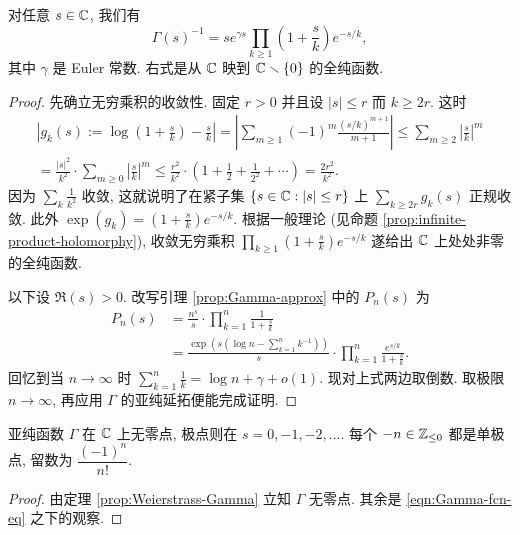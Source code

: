 \begin{theorem}[K.\ Weierstrass]\label{prop:Weierstrass-Gamma}
	对任意 $s \in \mathbb{C}$, 我们有
	\[ \Gamma(s)^{-1} = s e^{\gamma s} \prod_{k \geq 1} \left( 1 + \frac{s}{k} \right) e^{-s/k}, \]
	其中 $\gamma$ 是 Euler 常数.	右式是从 $\mathbb{C}$ 映到 $\mathbb{C} \smallsetminus \{0\}$ 的全纯函数.
\end{theorem}
\begin{proof}
	先确立无穷乘积的收敛性. 固定 $r > 0$ 并且设 $|s| \leq r$ 而 $k \geq 2r$. 这时
	\begin{multline*}
		\left| g_k(s) := \log\left( 1 + \frac{s}{k} \right) - \frac{s}{k} \right| = \left| \sum_{m \geq 1} (-1)^m \frac{(s/k)^{m+1}}{m+1} \right| \leq \sum_{m \geq 2} \left| \frac{s}{k} \right|^m \\
		= \frac{|s|^2}{k^2} \cdot \sum_{m \geq 0} \left|\frac{s}{k} \right|^m \leq \frac{r^2}{k^2} \cdot \left( 1 + \frac{1}{2} + \frac{1}{2^2} + \cdots \right) = \frac{2r^2}{k^2}.
	\end{multline*}
	因为 $\sum_k \frac{1}{k^2}$ 收敛, 这就说明了在紧子集 $\left\{ s \in \mathbb{C} : |s| \leq r \right\}$ 上 $\sum_{k \geq 2r} g_k(s)$ 正规收敛. 此外 $\exp(g_k) = \left( 1 + \frac{s}{k} \right) e^{-s/k}$. 根据一般理论 (见命题 \ref{prop:infinite-product-holomorphy}), 收敛无穷乘积 $\prod_{k \geq 1} \left(1 + \frac{s}{k} \right) e^{-s/k}$ 遂给出 $\mathbb{C}$ 上处处非零的全纯函数.
	
	以下设 $\Re(s) > 0$. 改写引理 \ref{prop:Gamma-approx} 中的 $P_n(s)$ 为
	\begin{align*}
		P_n(s) & = \frac{n^s}{s} \cdot \prod_{k=1}^n \frac{1}{1 + \frac{s}{k}} \\
		& = \frac{\exp\left( s(\log n - \sum_{k=1}^n k^{-1} ) \right)}{s} \cdot \prod_{k=1}^n \frac{e^{s/k}}{1 + \frac{s}{k}}.
	\end{align*}
	回忆到当 $n \to \infty$ 时 $\sum_{k=1}^n \frac{1}{k} = \log n + \gamma + o(1)$. 现对上式两边取倒数. 取极限 $n \to \infty$, 再应用 $\Gamma$ 的亚纯延拓便能完成证明.
\end{proof}

\begin{corollary}\label{prop:Gamma-poles}
	亚纯函数 $\Gamma$ 在 $\mathbb{C}$ 上无零点, 极点则在 $s = 0,-1,-2, \ldots$. 每个 $-n \in \mathbb{Z}_{\leq 0}$ 都是单极点, 留数为 $\dfrac{(-1)^n}{n!}$.
\end{corollary}
\begin{proof}
	由定理 \ref{prop:Weierstrass-Gamma} 立知 $\Gamma$ 无零点. 其余是 \eqref{eqn:Gamma-fcn-eq} 之下的观察.
\end{proof}

